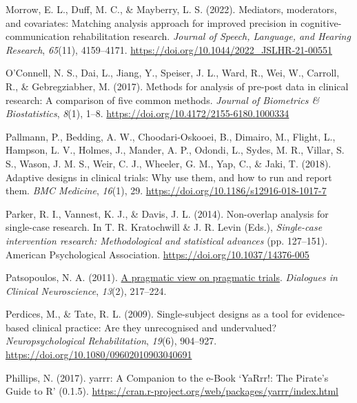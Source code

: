 \documentclass{krantz}
\newlength{\cslhangindent}
\newlength{\cslentryspacingunit} %
\newenvironment{CSLReferences}[2] %
{%
\setlength{\parindent}{0pt}
\ifodd #1
\let\oldpar\par
\def\par{\hangindent=\cslhangindent\oldpar}
\fi
\setlength{\parskip}{#2\cslentryspacingunit}
}%
{}
\begin{document}
\begin{CSLReferences}{1}{0}
\leavevmode{}%
Morrow, E. L., Duff, M. C., \& Mayberry, L. S. (2022). Mediators, moderators, and covariates: Matching analysis approach for improved precision in cognitive-communication rehabilitation research. \emph{Journal of Speech, Language, and Hearing Research}, \emph{65}(11), 4159--4171. \url{https://doi.org/10.1044/2022_JSLHR-21-00551}

\leavevmode{}%
O'Connell, N. S., Dai, L., Jiang, Y., Speiser, J. L., Ward, R., Wei, W., Carroll, R., \& Gebregziabher, M. (2017). Methods for analysis of pre-post data in clinical research: {A} comparison of five common methods. \emph{Journal of Biometrics \& Biostatistics}, \emph{8}(1), 1--8. \url{https://doi.org/10.4172/2155-6180.1000334}

\leavevmode{}%
Pallmann, P., Bedding, A. W., Choodari-Oskooei, B., Dimairo, M., Flight, L., Hampson, L. V., Holmes, J., Mander, A. P., Odondi, L., Sydes, M. R., Villar, S. S., Wason, J. M. S., Weir, C. J., Wheeler, G. M., Yap, C., \& Jaki, T. (2018). Adaptive designs in clinical trials: Why use them, and how to run and report them. \emph{BMC Medicine}, \emph{16}(1), 29. \url{https://doi.org/10.1186/s12916-018-1017-7}

\leavevmode{}%
Parker, R. I., Vannest, K. J., \& Davis, J. L. (2014). Non-overlap analysis for single-case research. In T. R. Kratochwill \& J. R. Levin (Eds.), \emph{Single-case intervention research: {Methodological} and statistical advances} (pp. 127--151). {American Psychological Association}. \url{https://doi.org/10.1037/14376-005}

\leavevmode{}%
Patsopoulos, N. A. (2011). \href{https://www.ncbi.nlm.nih.gov/pmc/articles/PMC3181997}{A pragmatic view on pragmatic trials}. \emph{Dialogues in Clinical Neuroscience}, \emph{13}(2), 217--224.

\leavevmode{}%
Perdices, M., \& Tate, R. L. (2009). Single-subject designs as a tool for evidence-based clinical practice: {Are} they unrecognised and undervalued? \emph{Neuropsychological Rehabilitation}, \emph{19}(6), 904--927. \url{https://doi.org/10.1080/09602010903040691}

\leavevmode{}%
Phillips, N. (2017). yarrr: A Companion to the e-Book ‘YaRrr!: The Pirate’s Guide to R’ (0.1.5). \url{https://cran.r-project.org/web/packages/yarrr/index.html}



\end{CSLReferences}
\end{document}
